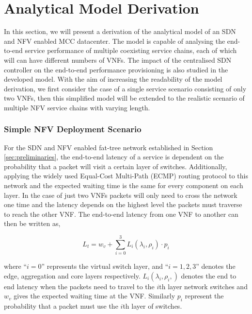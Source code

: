 
\section{Analytical Model Derivation}
\label{sec:analytical_model}

In this section, we will present a derivation of the analytical model of an SDN and NFV enabled MCC datacenter. The model is capable of analysing the end-to-end service performance of multiple coexisting service chains, each of which will can have different numbers of VNFs. The impact of the centralised SDN controller on the end-to-end performance provisioning is also studied in the developed model. With the aim of increasing the readability of the model derivation, we first consider the case of a single service scenario consisting of only two VNFs, then this simplified model will be extended to the realistic scenario of multiple NFV service chains with varying length.

\subsubsection{Simple NFV Deployment Scenario}
For the SDN and NFV enabled fat-tree network established in Section \ref{sec:preliminaries}, the end-to-end latency of a service is dependent on the probability that a packet will visit a certain layer of switches. Additionally, applying the widely used Equal-Cost Multi-Path (ECMP) \cite{ChiesaKS17} routing protocol to this network and the expected waiting time is the same for every component on each layer. In the case of just two VNFs packets will only need to cross the network one time and the latency depends on the highest level the packets must traverse to reach the other VNF. The end-to-end latency from one VNF to another can then be written as,

\begin{equation}
    \label{eq:mean_latency}
    L_t = w_v + \sum_{i=0}^3 L_i(\lambda_i, \rho_i) \cdot p_i
\end{equation}

\noindent where ``$i=0$'' represents the virtual switch layer, and ``$i=1,2,3$'' denotes the edge, aggregation and core layers respectively. $L_i(\lambda_i, \rho_i,)$ denotes the end to end latency when the packets need to travel to the $i$th layer network switches and $w_v$ gives the expected waiting time at the VNF. Similarly $p_i$ represent the probability that a packet must use the $i$th layer of switches.

